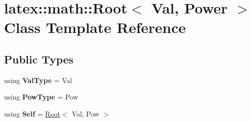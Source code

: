 \hypertarget{classlatex_1_1math_1_1Root}{\section{latex\-:\-:math\-:\-:Root$<$ Val, Power $>$ Class Template Reference}
\label{classlatex_1_1math_1_1Root}
}
\subsection*{Public Types}
\begin{DoxyCompactItemize}
\item 
\hypertarget{classlatex_1_1math_1_1Root_a58328f60cf2e5a35536bb778abd47ec9}{using {\bfseries Val\-Type} = Val}\label{classlatex_1_1math_1_1Root_a58328f60cf2e5a35536bb778abd47ec9}

\item 
\hypertarget{classlatex_1_1math_1_1Root_a2e66f7cab7cf8282c9a3249a1f459e7d}{using {\bfseries Pow\-Type} = Pow}\label{classlatex_1_1math_1_1Root_a2e66f7cab7cf8282c9a3249a1f459e7d}

\item 
\hypertarget{classlatex_1_1math_1_1Root_a4c920750762aae977ec39d5215f4c366}{using {\bfseries Self} = \hyperlink{classlatex_1_1math_1_1Root}{Root}$<$ Val, Pow $>$}\label{classlatex_1_1math_1_1Root_a4c920750762aae977ec39d5215f4c366}

\end{DoxyCompactItemize}

